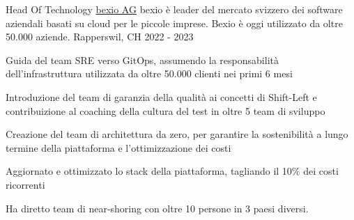 
\begin{cventries}
  \cventry
    {Head Of Technology} %
    {\href{https://www.bexio.com}{bexio AG}} %
    {bexio è leader del mercato svizzero dei software aziendali basati su cloud per le piccole imprese. Bexio è oggi utilizzato da oltre 50.000 aziende.} %
    {Rapperswil, CH} %
    {2022 - 2023} %
    {
      \begin{cvitems} %
      	\item {Guida del team SRE verso GitOps, assumendo la responsabilità dell'infrastruttura utilizzata da oltre 50.000 clienti nei primi 6 mesi}
      	\item {Introduzione del team di garanzia della qualità ai concetti di Shift-Left e contribuizione al coaching della cultura del test in oltre 5 team di sviluppo}
        \item {Creazione del team di architettura da zero, per garantire la sostenibilità a lungo termine della piattaforma e l'ottimizzazione dei costi}
        \item {Aggiornato e ottimizzato lo stack della piattaforma, tagliando il 10\% dei costi ricorrenti}
        \item {Ha diretto team di near-shoring con oltre 10 persone in 3 paesi diversi.}
      \end{cvitems}
    }


\end{cventries}
